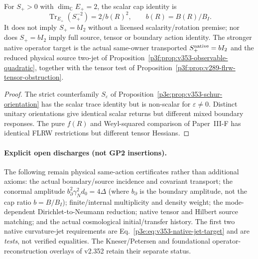 \documentclass[12pt,a4paper]{article}
\begin{document}
\begin{proposition}
\label{p6c:prop:v353-native-action-status}
For $S_+>0$ with $\dim_{\mathbb C}E_+=2$, the scalar cap identity is
\[
 \operatorname{Tr}_{E_+}(S_+^{-2})=2/b(R)^2,
 \qquad b(R)=B(R)/B_I.
\]
It does not imply $S_+=bI_2$ without a licensed scalarity/rotation
premise; nor does $S_+=bI_2$ imply full source, tensor or boundary
action identity.  The stronger native operator target is the actual
same-owner transported $S_+^{\rm native}=bI_2$ and the reduced
physical source two-jet of
Proposition~\ref{p3f:prop:v353-observable-quadratic}, together with
the tensor test of Proposition~\ref{p3f:prop:v289-flrw-tensor-obstruction}.
\end{proposition}
\begin{proof}
The strict counterfamily $S_\varepsilon$ of
Proposition~\ref{p3e:prop:v353-schur-orientation} has the scalar
trace identity but is non-scalar for $\varepsilon\ne0$.  Distinct
unitary orientations give identical scalar returns but different
mixed boundary responses.  The pure $f(R)$ and Weyl-squared
comparison of Paper~III-F has identical FLRW restrictions but
different tensor Hessians.
\end{proof}

\paragraph{Explicit open discharges (not GP2 insertions).}
The following remain physical same-action certificates rather than
additional axioms: the actual boundary/source incidence and covariant
transport; the conormal amplitude $b_\partial^2\gamma_N^2d_0=4\Delta$
(where $b_\partial$ is the boundary amplitude, not the cap ratio
$b=B/B_I$); finite/internal multiplicity and density weight; the
mode-dependent Dirichlet-to-Neumann reduction; native tensor and
Hilbert source matching; and the actual cosmological initial/transfer
history.  The first two native curvature-jet requirements are
Eq.~\eqref{p3e:eq:v353-native-jet-target} and are \emph{tests}, not
verified equalities.  The Kneser/Petersen and foundational
operator-reconstruction overlays of v2.352 retain their separate
status.


\end{document}
